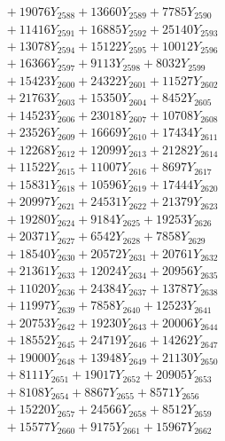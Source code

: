 \documentclass[a4paper,10pt]{article}
\begin{document}
{\begin{align}
&\;  + 19076 Y_{2588} + 13660 Y_{2589} + 7785 Y_{2590} \\[0.3ex]
&\;  + 11416 Y_{2591} + 16885 Y_{2592} + 25140 Y_{2593} \\[0.3ex]
&\;  + 13078 Y_{2594} + 15122 Y_{2595} + 10012 Y_{2596} \\[0.3ex]
&\;  + 16366 Y_{2597} + 9113 Y_{2598} + 8032 Y_{2599} \\[0.3ex]
&\;  + 15423 Y_{2600} + 24322 Y_{2601} + 11527 Y_{2602} \\[0.3ex]
&\;  + 21763 Y_{2603} + 15350 Y_{2604} + 8452 Y_{2605} \\[0.3ex]
&\;  + 14523 Y_{2606} + 23018 Y_{2607} + 10708 Y_{2608} \\[0.5ex]\allowbreak
&\;  + 23526 Y_{2609} + 16669 Y_{2610} + 17434 Y_{2611} \\[0.3ex]
&\;  + 12268 Y_{2612} + 12099 Y_{2613} + 21282 Y_{2614} \\[0.3ex]
&\;  + 11522 Y_{2615} + 11007 Y_{2616} + 8697 Y_{2617} \\[0.3ex]
&\;  + 15831 Y_{2618} + 10596 Y_{2619} + 17444 Y_{2620} \\[0.3ex]
&\;  + 20997 Y_{2621} + 24531 Y_{2622} + 21379 Y_{2623} \\[0.3ex]
&\;  + 19280 Y_{2624} + 9184 Y_{2625} + 19253 Y_{2626} \\[0.3ex]
&\;  + 20371 Y_{2627} + 6542 Y_{2628} + 7858 Y_{2629} \\[0.3ex]
&\;  + 18540 Y_{2630} + 20572 Y_{2631} + 20761 Y_{2632} \\[0.3ex]
&\;  + 21361 Y_{2633} + 12024 Y_{2634} + 20956 Y_{2635} \\[0.3ex]
&\;  + 11020 Y_{2636} + 24384 Y_{2637} + 13787 Y_{2638} \\[0.5ex]\allowbreak
&\;  + 11997 Y_{2639} + 7858 Y_{2640} + 12523 Y_{2641} \\[0.3ex]
&\;  + 20753 Y_{2642} + 19230 Y_{2643} + 20006 Y_{2644} \\[0.3ex]
&\;  + 18552 Y_{2645} + 24719 Y_{2646} + 14262 Y_{2647} \\[0.3ex]
&\;  + 19000 Y_{2648} + 13948 Y_{2649} + 21130 Y_{2650} \\[0.3ex]
&\;  + 8111 Y_{2651} + 19017 Y_{2652} + 20905 Y_{2653} \\[0.3ex]
&\;  + 8108 Y_{2654} + 8867 Y_{2655} + 8571 Y_{2656} \\[0.3ex]
&\;  + 15220 Y_{2657} + 24566 Y_{2658} + 8512 Y_{2659} \\[0.3ex]
&\;  + 15577 Y_{2660} + 9175 Y_{2661} + 15967 Y_{2662} \\[0.3ex]

\end{align}}
\end{document}
